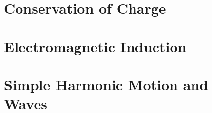 \documentclass[answers]{exam}
\newif\ifShowUnitVIII    %
\newif\ifShowUnitIX      %
\newif\ifShowUnitX       %
\newif\ifShowUnitXI      %
\begin{document}
\ifShowUnitVIII

\fi

\section{Conservation of Charge}

\ifShowUnitIX

\fi

\section{Electromagnetic Induction}

\ifShowUnitX

\fi

\section{Simple Harmonic Motion and Waves}

\ifShowUnitXI

\fi
\end{document}

